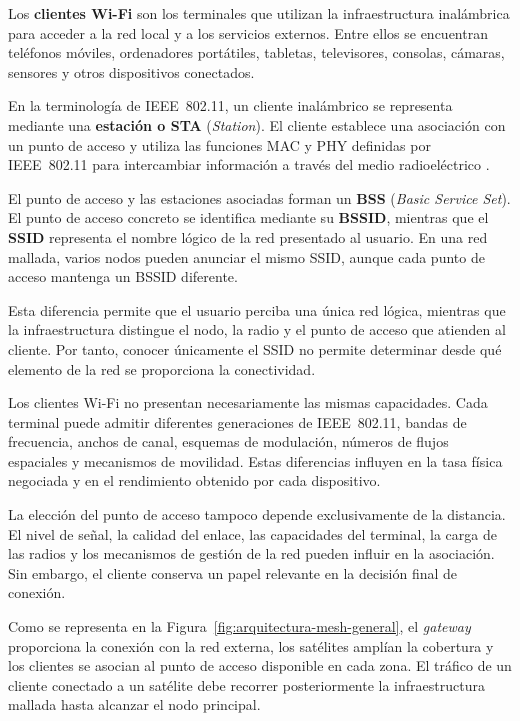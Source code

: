 Los \textbf{clientes Wi-Fi} son los terminales que utilizan la
infraestructura inalámbrica para acceder a la red local y a los servicios
externos. Entre ellos se encuentran teléfonos móviles, ordenadores
portátiles, tabletas, televisores, consolas, cámaras, sensores y otros
dispositivos conectados.

En la terminología de IEEE~802.11, un cliente inalámbrico se representa
mediante una \textbf{estación o STA} (\textit{Station}). El cliente
establece una asociación con un punto de acceso y utiliza las funciones
MAC y PHY definidas por IEEE~802.11 para intercambiar información a
través del medio radioeléctrico \cite{ieee_80211_2024}.

El punto de acceso y las estaciones asociadas forman un
\textbf{BSS} (\textit{Basic Service Set}). El punto de acceso concreto se
identifica mediante su \textbf{BSSID}, mientras que el
\textbf{SSID} representa el nombre lógico de la red presentado al
usuario. En una red mallada, varios nodos pueden anunciar el mismo SSID,
aunque cada punto de acceso mantenga un BSSID diferente.

Esta diferencia permite que el usuario perciba una única red lógica,
mientras que la infraestructura distingue el nodo, la radio y el punto
de acceso que atienden al cliente. Por tanto, conocer únicamente el SSID
no permite determinar desde qué elemento de la red se proporciona la
conectividad.

Los clientes Wi-Fi no presentan necesariamente las mismas capacidades.
Cada terminal puede admitir diferentes generaciones de IEEE~802.11,
bandas de frecuencia, anchos de canal, esquemas de modulación, números de
flujos espaciales y mecanismos de movilidad. Estas diferencias influyen
en la tasa física negociada y en el rendimiento obtenido por cada
dispositivo.

La elección del punto de acceso tampoco depende exclusivamente de la
distancia. El nivel de señal, la calidad del enlace, las capacidades del
terminal, la carga de las radios y los mecanismos de gestión de la red
pueden influir en la asociación. Sin embargo, el cliente conserva un
papel relevante en la decisión final de conexión.

Como se representa en la
Figura~\ref{fig:arquitectura-mesh-general}, el
\textit{gateway} proporciona la conexión con la red externa, los
satélites amplían la cobertura y los clientes se asocian al punto de
acceso disponible en cada zona. El tráfico de un cliente conectado a un
satélite debe recorrer posteriormente la infraestructura mallada hasta
alcanzar el nodo principal.

